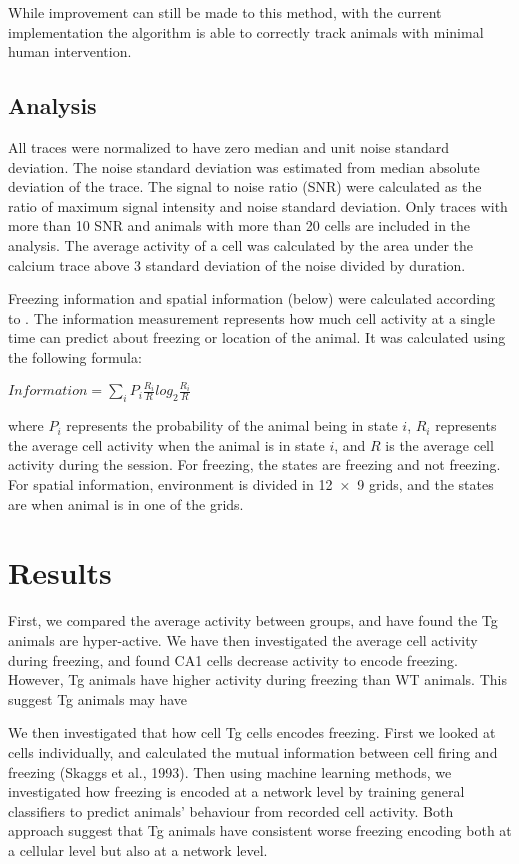 While improvement can still be made to this method, with the current implementation the algorithm is able to correctly track animals with minimal human intervention. 


\subsection{Analysis}

All traces were normalized to have zero median and unit noise standard deviation. The noise standard deviation was estimated from median absolute deviation of the trace. The signal to noise ratio (SNR) were calculated as the ratio of maximum signal intensity and noise standard deviation. Only traces with more than 10 SNR and animals with more than 20 cells are included in the analysis. The average activity of a cell was calculated by the area under the calcium trace above 3 standard deviation of the noise divided by duration.

Freezing information and spatial information (below) were calculated according to \citet{skaggs93}. The information measurement represents how much cell activity at a single time can predict about freezing or location of the animal.  It was calculated using the following formula:

$Information = \displaystyle\sum_{i}^{}P_i  \frac{R_i}{R} log_2 \frac{R_i}{R}$

where $P_i$ represents the probability of the animal being in state $i$,  $R_i$ represents the average cell activity when the animal is in state $i$, and $R$ is the average cell activity during the session. For freezing, the states are freezing and not freezing. For spatial information, environment is divided in \num{12 x 9} grids, and the states are when animal is in one of the grids.

\section{Results}
First, we compared the average activity between groups, and have found the Tg animals are hyper-active. We have then investigated the average cell activity during freezing, and found CA1 cells decrease activity to encode freezing. However, Tg animals have higher activity during freezing than WT animals. This suggest Tg animals may have 

We then investigated that how cell Tg cells encodes freezing. First we looked at cells individually, and calculated the mutual information between cell firing and freezing (Skaggs et al., 1993). Then using machine learning methods, we investigated how freezing is encoded at a network level by training general classifiers to predict animals' behaviour from recorded cell activity. Both approach suggest that Tg animals have consistent worse freezing encoding both at a cellular level but also at a network level. 

